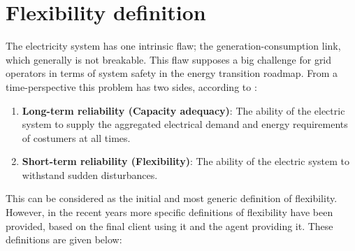 \section{Flexibility definition}
The electricity system has one intrinsic flaw; the generation-consumption link, which generally is not breakable. This flaw supposes a big challenge for grid operators in terms of system safety in the energy transition roadmap. From a time-perspective this problem has two sides, according to \cite{FINON2008143}:

\begin{enumerate}
\item \textbf{Long-term reliability (Capacity adequacy)}: The ability of the electric system to supply the aggregated electrical demand and energy requirements of costumers at all times.  \cite{FINON2008143}
\item \textbf{Short-term reliability (Flexibility)}: The ability of the electric system to withstand sudden disturbances.
\end{enumerate}

This can be considered as the initial and most generic definition of flexibility. However, in the recent years more specific definitions of flexibility have been provided, based on the final client using it and the agent providing it. These definitions are given below:

